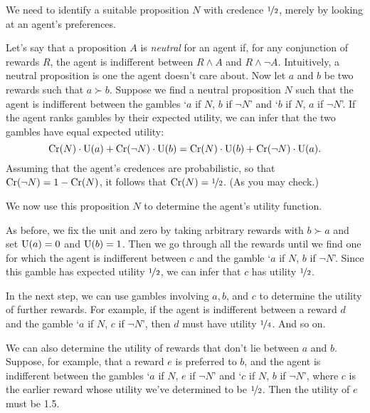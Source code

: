 We need to identify a suitable proposition $N$ with credence $\nicefrac{1}{2}$,
merely by looking at an agent's preferences.

Let's say that a proposition $A$ is \emph{neutral} for an agent if, for any
conjunction of rewards $R$, the agent is indifferent between $R \land A$ and
$R \land \neg A$. Intuitively, a neutral proposition is one the agent doesn't
care about. Now let $a$ and $b$ be two rewards such that $a \succ b$. Suppose we
find a neutral proposition $N$ such that the agent is indifferent between the
gambles `$a$ if $N$, $b$ if $\neg N$' and `$b$ if $N$, $a$ if $\neg N$'. If the
agent ranks gambles by their expected utility, we can infer that the two gambles
have equal expected utility:
\[
  \text{Cr}(N) \cdot \text{U}(a) + \text{Cr}(\neg N) \cdot \text{U}(b) = \text{Cr}(N) \cdot \text{U}(b) + \text{Cr}(\neg N) \cdot \text{U}(a).
\]
Assuming that the agent's credences are probabilistic, so that
$\text{Cr}(\neg N) = 1-\text{Cr}(N)$, it follows that $\text{Cr}(N) = \nicefrac{1}{2}$. (As you
may check.)


We now use this proposition $N$ to determine the agent's utility function.

As before, we fix the unit and zero by taking arbitrary rewards with $b \succ a$
and set $\text{U}(a)=0$ and $\text{U}(b)=1$. Then we go through all the rewards until we
find one for which the agent is indifferent between $c$ and the gamble `$a$ if
$N$, $b$ if $\neg N$'. Since this gamble has expected utility $\nicefrac{1}{2}$,
we can infer that $c$ has utility $\nicefrac{1}{2}$.

In the next step, we can use gambles involving $a,b$, and $c$ to determine the
utility of further rewards. For example, if the agent is indifferent between a
reward $d$ and the gamble `$a$ if $N$, $c$ if $\neg N$', then $d$ must have
utility $\nicefrac{1}{4}$. And so on.

We can also determine the utility of rewards that don't lie between $a$ and $b$.
Suppose, for example, that a reward $e$ is preferred to $b$, and the agent is
indifferent between the gambles `$a$ if $N$, $e$ if $\neg N$' and `$c$ if $N$,
$b$ if $\neg N$', where $c$ is the earlier reward whose utility we've determined
to be $\nicefrac{1}{2}$. Then the utility of $e$ must be 1.5.

